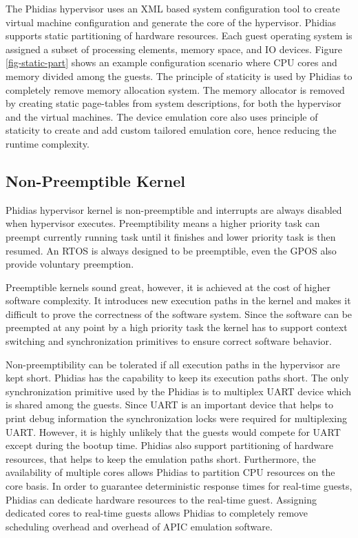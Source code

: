 The Phidias hypervisor uses an XML based system configuration tool to create virtual machine configuration and generate the core of the hypervisor.
Phidias supports static partitioning of hardware resources. 
Each guest operating system is assigned a subset of processing elements, memory space, and IO devices.
Figure \ref{fig-static-part} shows an example configuration scenario where CPU cores and memory divided among the guests.
The principle of staticity is used by Phidias to completely remove memory allocation system.
The memory allocator is removed by creating static page-tables from system descriptions, for both the hypervisor and the virtual machines.
The device emulation core also uses principle of staticity to create and add custom tailored emulation core,
hence reducing the runtime complexity.



\subsection{Non-Preemptible Kernel}
Phidias hypervisor kernel is non-preemptible and interrupts are always disabled when hypervisor executes. 
Preemptibility means a higher priority task can preempt currently running task until it finishes and lower priority task is then resumed.
An RTOS is always designed to be preemptible, even the GPOS also provide voluntary preemption.

Preemptible kernels sound great, however, it is achieved at the cost of higher software complexity.  
It introduces new execution paths in the kernel and makes it difficult to prove the correctness of the software system.
Since the software can be preempted at any point by a high priority task the kernel has to support context switching and
synchronization primitives to ensure correct software behavior.

Non-preemptibility can be tolerated if all execution paths in the hypervisor are kept short.
Phidias has the capability to keep its execution paths short.
The only synchronization primitive used by the Phidias is to multiplex UART device which is shared among the guests. 
Since UART is an important device that helps to print debug information the synchronization locks were required for multiplexing UART.
However, it is highly unlikely that the guests would compete for UART except during the bootup time.
Phidias also support partitioning of hardware resources, that helps to keep the emulation paths short.
Furthermore, the availability of multiple cores allows Phidias to partition CPU resources on the core basis. 
In order to guarantee deterministic response times for real-time guests, Phidias can dedicate hardware resources to the real-time guest.
Assigning dedicated cores to real-time guests allows Phidias to completely remove scheduling overhead and overhead of APIC emulation software.

